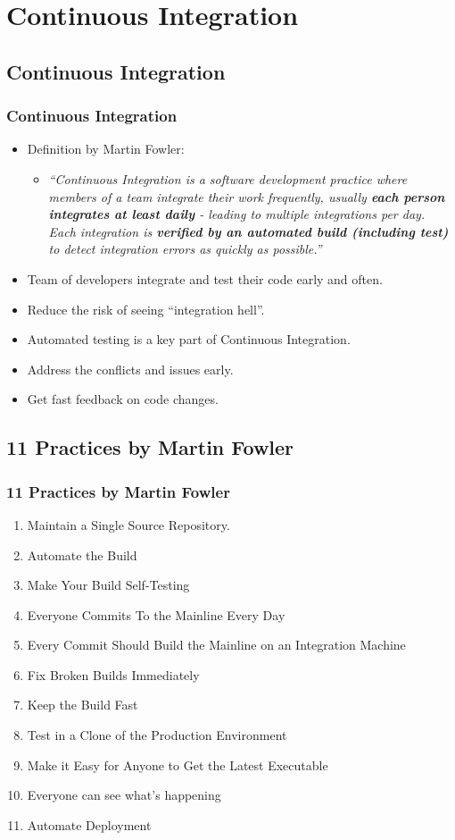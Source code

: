 
\section[Continuous Integration]{Continuous Integration}

\subsection[]{Continuous Integration}
\begin{frame}
\frametitle{Continuous Integration}
\begin{itemize}%
	\item Definition by Martin Fowler:
		\begin{itemize}
		\item \emph{“Continuous Integration is a software development practice where members of a team integrate their work frequently, usually \textbf{each person integrates at least daily} - leading to multiple integrations per day. Each integration is \textbf{verified by an automated build (including test)} to detect integration errors as quickly as possible.”}
		\end{itemize}
	\item Team of developers integrate and test their code early and often.
	\item Reduce the risk of seeing “integration hell”.
	\item Automated testing is a key part of Continuous Integration.
	\item Address the conflicts and issues early.
	\item Get fast feedback on code changes.
\end{itemize}
\end{frame}

\subsection[]{11 Practices by Martin Fowler}
\begin{frame}
\frametitle{11 Practices by Martin Fowler}
\begin{enumerate}
	\item Maintain a Single Source Repository.
	\item Automate the Build
	\item Make Your Build Self-Testing
	\item Everyone Commits To the Mainline Every Day
	\item Every Commit Should Build the Mainline on an Integration Machine
	\item Fix Broken Builds Immediately
	\item Keep the Build Fast
	\item Test in a Clone of the Production Environment
	\item Make it Easy for Anyone to Get the Latest Executable
	\item Everyone can see what's happening
	\item Automate Deployment
\end{enumerate}
\end{frame}


